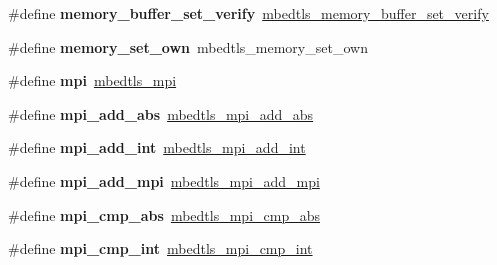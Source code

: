 \begin{DoxyCompactItemize}
\item 
\mbox{\label{compat-1_83_8h_a05560341919cae231f6512d8890a317c}} 
\#define {\bfseries memory\+\_\+buffer\+\_\+set\+\_\+verify}~\mbox{\hyperlink{memory__buffer__alloc_8h_aaa50603bb2f2f1fe8d97d6953589b832}{mbedtls\+\_\+memory\+\_\+buffer\+\_\+set\+\_\+verify}}
\item 
\mbox{\label{compat-1_83_8h_ac1e9c5610ef981ee0b6ec84e55fbec54}} 
\#define {\bfseries memory\+\_\+set\+\_\+own}~mbedtls\+\_\+memory\+\_\+set\+\_\+own
\item 
\mbox{\label{compat-1_83_8h_ab8a58149c3175c180a0b60682aa9d75b}} 
\#define {\bfseries mpi}~\mbox{\hyperlink{structmbedtls__mpi}{mbedtls\+\_\+mpi}}
\item 
\mbox{\label{compat-1_83_8h_a39fa3888df8f858b67c0157381606625}} 
\#define {\bfseries mpi\+\_\+add\+\_\+abs}~\mbox{\hyperlink{bignum_8h_a5ddb2c6dc59dd39874695e04ff40afdb}{mbedtls\+\_\+mpi\+\_\+add\+\_\+abs}}
\item 
\mbox{\label{compat-1_83_8h_a24b2bfe78b7d45c596a74506c3da5be9}} 
\#define {\bfseries mpi\+\_\+add\+\_\+int}~\mbox{\hyperlink{bignum_8h_a1e6f6ba90e3c73ce6022ed7354443b2a}{mbedtls\+\_\+mpi\+\_\+add\+\_\+int}}
\item 
\mbox{\label{compat-1_83_8h_a349034b3fb57e63938ff69a8664328a6}} 
\#define {\bfseries mpi\+\_\+add\+\_\+mpi}~\mbox{\hyperlink{bignum_8h_a5fd1cfd561c1ada500097f860aa4fe68}{mbedtls\+\_\+mpi\+\_\+add\+\_\+mpi}}
\item 
\mbox{\label{compat-1_83_8h_a2bd44bd987e944d8c0d0bd43ff882dfe}} 
\#define {\bfseries mpi\+\_\+cmp\+\_\+abs}~\mbox{\hyperlink{bignum_8h_a81ea45be21ea77f5d8deae9e99d9a11b}{mbedtls\+\_\+mpi\+\_\+cmp\+\_\+abs}}
\item 
\mbox{\label{compat-1_83_8h_aea85d550fd0cba66b964727e8aeaef5a}} 
\#define {\bfseries mpi\+\_\+cmp\+\_\+int}~\mbox{\hyperlink{bignum_8h_ad0e7f426326afc7d3fde309a7a8d82fa}{mbedtls\+\_\+mpi\+\_\+cmp\+\_\+int}}
\item 
\mbox{\label{compat-1_83_8h_a46f89f6e90a017b6e0cffc1e14c2035a}} 

\end{DoxyCompactItemize}
